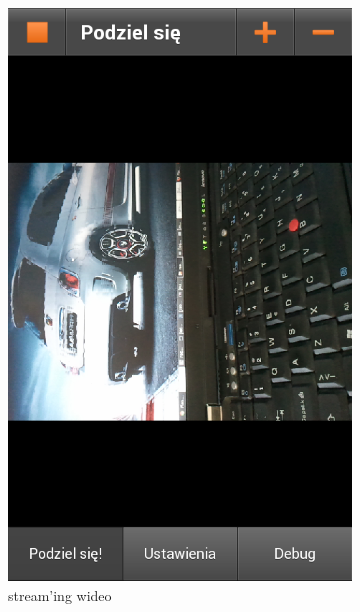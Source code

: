 \begin{figure}[h]
\begin{subfigure}[b]{0.3\textwidth}
                \centering
                \includegraphics[width=\textwidth]{img/screens/mobile_broadcaster/streaming-wideo.png}
                \caption{stream'ing wideo}
        \end{subfigure}
        ~ %
        \begin{subfigure}[b]{0.3\textwidth}
                \centering

\end{subfigure}
\end{figure}
